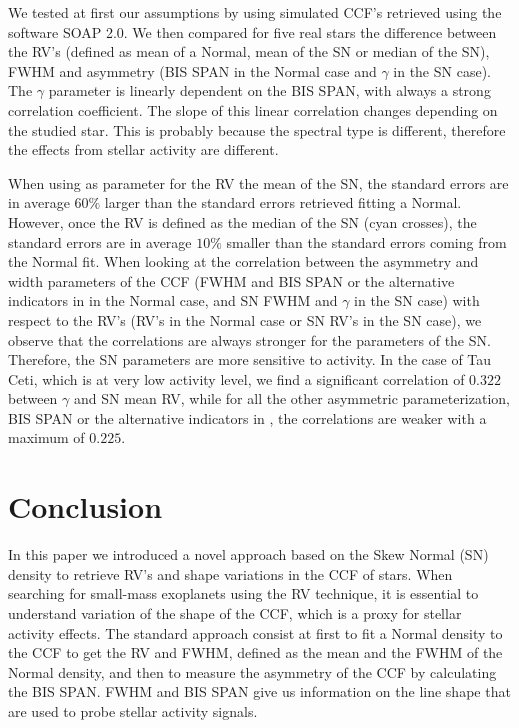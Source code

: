 \documentclass{aa}
\def\kms{\hbox{\,km\,s$^{-1}$}}       %
\begin{document}
We tested at first our assumptions by using simulated CCF's retrieved using the software SOAP 2.0. We then compared for five real stars the difference between the RV's (defined as mean of a Normal, mean of the SN or median of the SN), FWHM and asymmetry (BIS SPAN in the Normal case and $\gamma$ in the SN case). The $\gamma$ parameter is linearly dependent on the BIS SPAN, with always a strong correlation coefficient. 
The slope of this linear correlation changes depending on the studied star. This is probably because the spectral type is different, therefore the effects from stellar activity are different.

When using as parameter for the RV the mean of the SN, the standard errors are in average $60\%$ larger than the standard errors retrieved fitting a Normal. However, once the RV is defined as the median of the SN (cyan crosses), the standard errors are in average $10\%$ smaller than the standard errors coming from the Normal fit. When looking at the correlation between the asymmetry and width parameters of the CCF (FWHM and BIS SPAN or the alternative indicators in \citet{Figueira-2013} in the Normal case, and SN FWHM and $\gamma$ in the SN case) with respect to the RV's (RV's in the Normal case or SN RV's in the SN case), we observe that the correlations are always stronger for the parameters of the SN. Therefore, the SN parameters are more sensitive to activity. In the case of Tau Ceti, which is at very low activity level, we find a significant correlation of $0.322$ between $\gamma$ and SN mean RV, while for all the other asymmetric parameterization, BIS SPAN or the alternative indicators in \citet{Figueira-2013}, the correlations are weaker with a maximum of 0.$225$.

\section{Conclusion} \label{sec:conclu}

In this paper we introduced a novel approach based on the Skew Normal (SN) density to retrieve RV's and shape variations in the CCF of stars. When searching for small-mass exoplanets using the RV technique, it is essential to understand variation of the shape of the CCF, which is a proxy for stellar activity effects. The standard approach consist at first to fit a Normal density to the CCF to get the RV and FWHM, defined as the mean and the FWHM of the Normal density, and then to measure the asymmetry of the CCF by calculating the BIS SPAN. FWHM and BIS SPAN give us information on the line shape that are used to probe stellar activity signals. 
\end{document}
